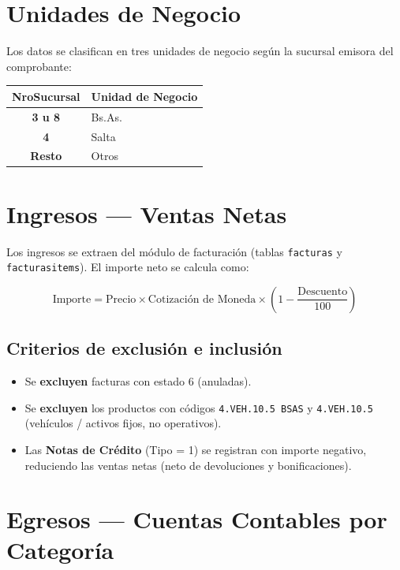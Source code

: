 \documentclass[12pt, a4paper]{article}
\begin{document}
\section{Unidades de Negocio}

Los datos se clasifican en tres unidades de negocio según la sucursal emisora del comprobante:

\vspace{0.5em}
\begin{center}
\begin{tabular}{>{\bfseries}cl}
\toprule
\rowcolor{azulclaro}
\textbf{NroSucursal} & \textbf{Unidad de Negocio} \\
\midrule
3 u 8 & Bs.As. \\
\rowcolor{grisclaro}
4 & Salta \\
Resto & Otros \\
\bottomrule
\end{tabular}
\end{center}

\section{Ingresos --- Ventas Netas}

Los ingresos se extraen del módulo de facturación (tablas \texttt{facturas} y \texttt{facturasitems}). El importe neto se calcula como:

\[
\text{Importe} = \text{Precio} \times \text{Cotización de Moneda} \times \left(1 - \frac{\text{Descuento}}{100}\right)
\]

\subsection*{Criterios de exclusión e inclusión}

\begin{itemize}
    \item Se \textbf{excluyen} facturas con estado 6 (anuladas).
    \item Se \textbf{excluyen} los productos con códigos \texttt{4.VEH.10.5 BSAS} y \texttt{4.VEH.10.5} (vehículos / activos fijos, no operativos).
    \item Las \textbf{Notas de Crédito} (Tipo = 1) se registran con importe negativo, reduciendo las ventas netas (neto de devoluciones y bonificaciones).
\end{itemize}

\section{Egresos --- Cuentas Contables por Categoría}
\end{document}
